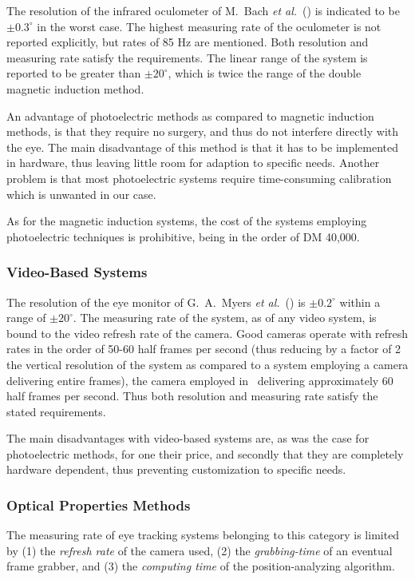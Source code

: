The resolution of the infrared oculometer of M.\ Bach {\em et
  al.\/}~(\cite{oculometer}) is indicated to be $\pm 0.3^{\circ}$ in
the worst case.  The highest measuring rate of the oculometer is not
reported explicitly, but rates of 85 Hz are mentioned.  Both
resolution and measuring rate satisfy the requirements.  The linear
range of the system is reported to be greater than $\pm 20^{\circ}$,
which is twice the range of the double magnetic induction method.

An advantage of photoelectric methods as compared to magnetic
induction methods, is that they require no surgery, and thus do not
interfere directly with the eye.  The main disadvantage of this
method is that it has to be implemented in hardware, thus leaving
little room for adaption to specific needs.  Another problem is that
most photoelectric systems require time-consuming calibration which
is unwanted in our case.

As for the magnetic induction systems, the cost of the systems
employing photoelectric techniques is prohibitive, being in the order
of DM 40,000.

\subsubsection{Video-Based Systems}

The resolution of the eye monitor of G.\ A.\ Myers {\em et
  al.\/}~(\cite{monitor}) is $\pm 0.2^{\circ}$ within a range of $\pm
20^{\circ}$.  The measuring rate of the system, as of any video system,
is bound to the video refresh rate of the camera.  Good cameras
operate with refresh rates in the order of 50-60 half frames per
second (thus reducing by a factor of 2 the vertical resolution of the
system as compared to a system employing a camera delivering entire
frames), the camera employed in~\cite{monitor} delivering
approximately 60 half frames per second.  Thus both resolution and
measuring rate satisfy the stated requirements.

The main disadvantages with video-based systems are, as was the case
for photoelectric methods, for one their price, and secondly that they
are completely hardware dependent, thus preventing customization to
specific needs.

\subsubsection{Optical Properties Methods}

The measuring rate of eye tracking systems belonging to this category
is limited by (1) the {\em refresh rate\/} of the camera used, (2) the
{\em grabbing-time\/} of an eventual frame grabber, and (3) the {\em
  computing time\/} of the position-analyzing algorithm.  

